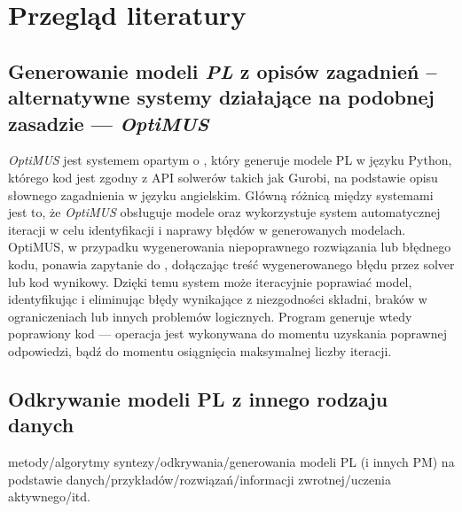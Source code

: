 
\chapter{Przegląd literatury}\label{ch:review}


\section{Generowanie modeli \textit{PL} z opisów zagadnień -- \\ alternatywne systemy działające na podobnej zasadzie --- \textit{OptiMUS}}\label{sec:optimus}
\textit{OptiMUS} \cite{ahmaditeshnizi2023optimus} jest systemem opartym o , który generuje modele PL w języku Python, którego kod jest zgodny z API solwerów takich jak Gurobi\cite{gurobi2023}, na podstawie opisu słownego zagadnienia w języku angielskim.
Główną różnicą między systemami jest to, że \textit{OptiMUS} obsługuje modele  oraz wykorzystuje system automatycznej iteracji w celu identyfikacji i naprawy błędów w generowanych modelach.
OptiMUS, w przypadku wygenerowania niepoprawnego rozwiązania lub błędnego kodu, ponawia zapytanie do , dołączając treść wygenerowanego błędu przez solver lub kod wynikowy. Dzięki temu system może iteracyjnie poprawiać model, identyfikując i eliminując błędy wynikające z niezgodności składni, braków w ograniczeniach lub innych problemów logicznych.
Program generuje wtedy poprawiony kod --- operacja jest wykonywana do momentu uzyskania poprawnej odpowiedzi, bądź do momentu osiągnięcia maksymalnej liczby iteracji.

\section{Odkrywanie modeli PL z innego rodzaju danych}
metody/algorytmy syntezy/odkrywania/generowania modeli PL (i innych PM) na podstawie danych/przykładów/rozwiązań/informacji zwrotnej/uczenia aktywnego/itd.

